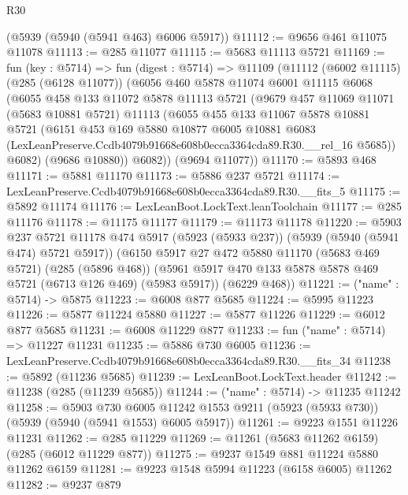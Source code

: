 \begin{lexlean}{R30}
\begin{coremodule}
    (@5939 (@5940 (@5941 @463) @6006 @5917))
@11112 := @9656 @461 @11075 @11078
@11113 := @285 @11077
@11115 := @5683 @11113 @5721
@11169 := fun (key : @5714) =>
  fun (digest : @5714) =>
  @11109
    (@11112
      (@6002 @11115)
      (@285 (@6128 @11077))
      (@6056
        @460
        @5878
        @11074
        @6001
        @11115
        @6068
        (@6055
          @458
          @133
          @11072
          @5878
          @11113
          @5721
          (@9679
            @457
            @11069
            @11071
            (@5683 @10881 @5721)
            @11113
            (@6055
              @455
              @133
              @11067
              @5878
              @10881
              @5721
              (@6151
                @453
                @169
                @5880
                @10877
                @6005
                @10881
                @6083
                (LexLeanPreserve.Ccdb4079b91668e608b0ecca3364cda89.R30.__rel_16 @5685))
              @6082)
            (@9686 @10880))
          @6082))
      (@9694 @11077))
@11170 := @5893 @468
@11171 := @5881 @11170
@11173 := @5886 @237 @5721
@11174 := LexLeanPreserve.Ccdb4079b91668e608b0ecca3364cda89.R30.__fits_5
@11175 := @5892 @11174
@11176 := LexLeanBoot.LockText.leanToolchain
@11177 := @285 @11176
@11178 := @11175 @11177
@11179 := @11173 @11178
@11220 := @5903
    @237
    @5721
    @11178
    @474
    @5917
    (@5923 (@5933 @237))
    (@5939 (@5940 (@5941 @474) @5721 @5917))
    (@6150
      @5917
      @27
      @472
      @5880
      @11170
      (@5683 @469 @5721)
      (@285 (@5896 @468))
      (@5961 @5917 @470 @133 @5878 @5878 @469 @5721 (@6713 @126 @469) (@5983 @5917))
      (@6229 @468))
@11221 := ("name" : @5714) -> @5875
@11223 := @6008 @877 @5685
@11224 := @5995 @11223
@11226 := @5877 @11224 @5880
@11227 := @5877 @11226
@11229 := @6012 @877 @5685
@11231 := @6008 @11229 @877
@11233 := fun ("name" : @5714) => @11227 @11231
@11235 := @5886 @730 @6005
@11236 := LexLeanPreserve.Ccdb4079b91668e608b0ecca3364cda89.R30.__fits_34
@11238 := @5892 (@11236 @5685)
@11239 := LexLeanBoot.LockText.header
@11242 := @11238 (@285 (@11239 @5685))
@11244 := ("name" : @5714) -> @11235 @11242
@11258 := @5903
    @730
    @6005
    @11242
    @1553
    @9211
    (@5923 (@5933 @730))
    (@5939 (@5940 (@5941 @1553) @6005 @5917))
@11261 := @9223 @1551 @11226 @11231
@11262 := @285 @11229
@11269 := @11261 (@5683 @11262 @6159) (@285 (@6012 @11229 @877))
@11275 := @9237 @1549 @881 @11224 @5880 @11262 @6159
@11281 := @9223 @1548 @5994 @11223 (@6158 @6005) @11262
@11282 := @9237 @879

\end{coremodule}
\end{lexlean}
